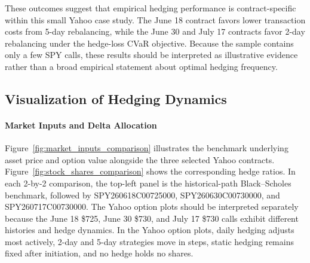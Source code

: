 \documentclass{article}
\begin{document}
These outcomes suggest that empirical hedging performance is contract-specific within this small Yahoo case study. The June 18 contract favors lower transaction costs from 5-day rebalancing, while the June 30 and July 17 contracts favor 2-day rebalancing under the hedge-loss CVaR objective. Because the sample contains only a few SPY calls, these results should be interpreted as illustrative evidence rather than a broad empirical statement about optimal hedging frequency.

\subsection{Visualization of Hedging Dynamics}

\paragraph{Market Inputs and Delta Allocation}

Figure~\ref{fig:market_inputs_comparison} illustrates the benchmark underlying asset price and option value alongside the three selected Yahoo contracts. Figure~\ref{fig:stock_shares_comparison} shows the corresponding hedge ratios. In each 2-by-2 comparison, the top-left panel is the historical-path Black--Scholes benchmark, followed by SPY260618C00725000, SPY260630C00730000, and SPY260717C00730000. The Yahoo option plots should be interpreted separately because the June 18 \$725, June 30 \$730, and July 17 \$730 calls exhibit different histories and hedge dynamics. In the Yahoo option plots, daily hedging adjusts most actively, 2-day and 5-day strategies move in steps, static hedging remains fixed after initiation, and no hedge holds no shares.
\end{document}

